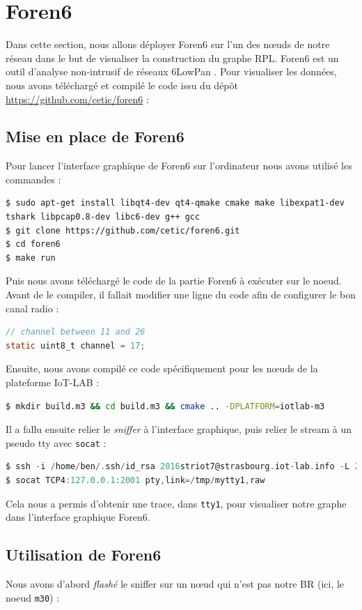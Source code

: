 \documentclass[	DIV=calc,%
							paper=a4,%
							fontsize=11pt,%
			  ]{scrartcl}	 					%
\begin{document}
\section{Foren6}
Dans cette section, nous allons déployer Foren6 sur l'un des nœuds de notre réseau dans le but de visualiser la construction du graphe RPL. Foren6 est un outil d'analyse non-intrusif de réseaux 6LowPan .
Pour visualiser les données, nous avons téléchargé et compilé le code issu du dépôt \url{https://github.com/cetic/foren6} :
\subsection{Mise en place de Foren6}
Pour lancer l'interface graphique de Foren6 sur l'ordinateur nous avons utilisé les commandes :
\begin{lstlisting}
$ sudo apt-get install libqt4-dev qt4-qmake cmake make libexpat1-dev tshark libpcap0.8-dev libc6-dev g++ gcc
$ git clone https://github.com/cetic/foren6.git
$ cd foren6
$ make run
\end{lstlisting}

Puis nous avons téléchargé le code de la partie Foren6 à exécuter sur le noeud. Avant de le compiler, il fallait modifier une ligne du code afin de configurer le bon canal radio :
\begin{lstlisting}[language=C]
// channel between 11 and 26
static uint8_t channel = 17;
\end{lstlisting}
Ensuite, nous avons compilé ce code spécifiquement pour les nœuds de la plateforme IoT-LAB :
\begin{lstlisting}[language=bash]
$ mkdir build.m3 && cd build.m3 && cmake .. -DPLATFORM=iotlab-m3
\end{lstlisting}

Il a fallu ensuite relier le \textit{sniffer} à l'interface graphique, puis relier le stream à un pseudo tty avec \texttt{socat} :

\begin{lstlisting}[language=C]
$ ssh -i /home/ben/.ssh/id_rsa 2016striot7@strasbourg.iot-lab.info -L 2001:m3-34:20000
$ socat TCP4:127.0.0.1:2001 pty,link=/tmp/mytty1,raw
\end{lstlisting}

Cela nous a permis d'obtenir une trace, dans \texttt{tty1}, pour visualiser notre graphe dans l'interface graphique Foren6.

\subsection{Utilisation de Foren6}
Nous avons d'abord \textit{flashé} le sniffer sur un nœud qui n'est pas notre BR (ici, le noeud \texttt{m30}) :
\end{document}
